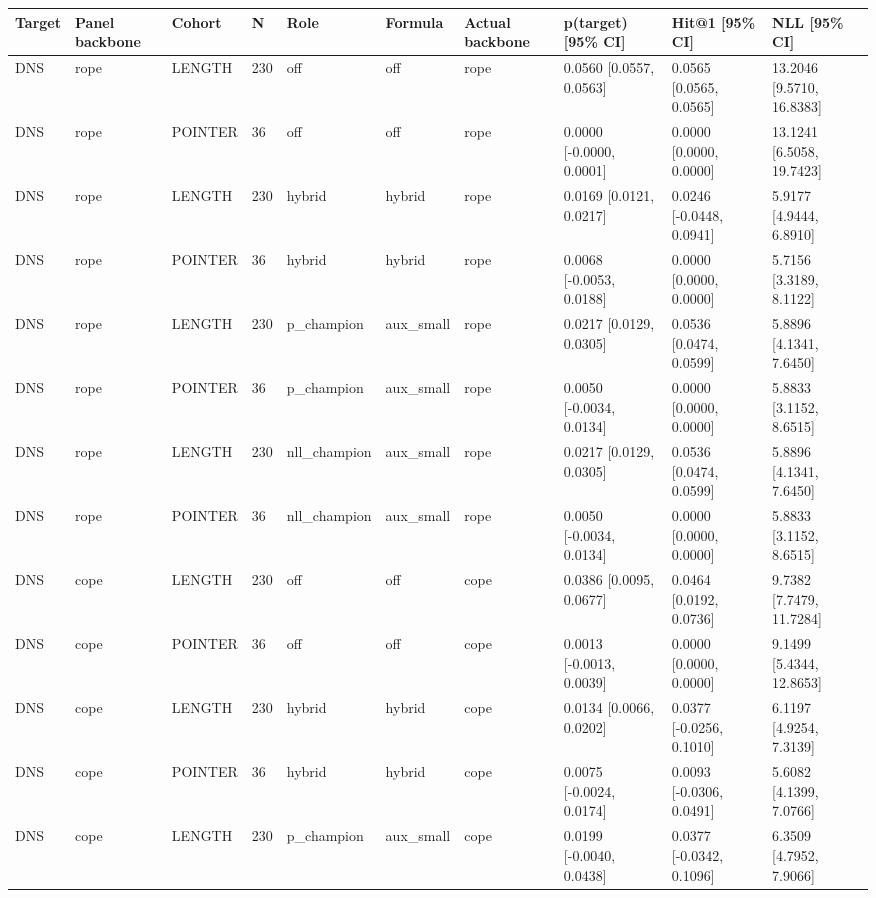 \begin{tabular}{llllllllll}
\hline
Target & Panel backbone & Cohort & N & Role & Formula & Actual backbone & p(target) [95\% CI] & Hit@1 [95\% CI] & NLL [95\% CI] \\
\hline
DNS & rope & LENGTH & 230 & off & off & rope & 0.0560 [0.0557, 0.0563] & 0.0565 [0.0565, 0.0565] & 13.2046 [9.5710, 16.8383] \\
DNS & rope & POINTER & 36 & off & off & rope & 0.0000 [-0.0000, 0.0001] & 0.0000 [0.0000, 0.0000] & 13.1241 [6.5058, 19.7423] \\
DNS & rope & LENGTH & 230 & hybrid & hybrid & rope & 0.0169 [0.0121, 0.0217] & 0.0246 [-0.0448, 0.0941] & 5.9177 [4.9444, 6.8910] \\
DNS & rope & POINTER & 36 & hybrid & hybrid & rope & 0.0068 [-0.0053, 0.0188] & 0.0000 [0.0000, 0.0000] & 5.7156 [3.3189, 8.1122] \\
DNS & rope & LENGTH & 230 & p\_champion & aux\_small & rope & 0.0217 [0.0129, 0.0305] & 0.0536 [0.0474, 0.0599] & 5.8896 [4.1341, 7.6450] \\
DNS & rope & POINTER & 36 & p\_champion & aux\_small & rope & 0.0050 [-0.0034, 0.0134] & 0.0000 [0.0000, 0.0000] & 5.8833 [3.1152, 8.6515] \\
DNS & rope & LENGTH & 230 & nll\_champion & aux\_small & rope & 0.0217 [0.0129, 0.0305] & 0.0536 [0.0474, 0.0599] & 5.8896 [4.1341, 7.6450] \\
DNS & rope & POINTER & 36 & nll\_champion & aux\_small & rope & 0.0050 [-0.0034, 0.0134] & 0.0000 [0.0000, 0.0000] & 5.8833 [3.1152, 8.6515] \\
DNS & cope & LENGTH & 230 & off & off & cope & 0.0386 [0.0095, 0.0677] & 0.0464 [0.0192, 0.0736] & 9.7382 [7.7479, 11.7284] \\
DNS & cope & POINTER & 36 & off & off & cope & 0.0013 [-0.0013, 0.0039] & 0.0000 [0.0000, 0.0000] & 9.1499 [5.4344, 12.8653] \\
DNS & cope & LENGTH & 230 & hybrid & hybrid & cope & 0.0134 [0.0066, 0.0202] & 0.0377 [-0.0256, 0.1010] & 6.1197 [4.9254, 7.3139] \\
DNS & cope & POINTER & 36 & hybrid & hybrid & cope & 0.0075 [-0.0024, 0.0174] & 0.0093 [-0.0306, 0.0491] & 5.6082 [4.1399, 7.0766] \\
DNS & cope & LENGTH & 230 & p\_champion & aux\_small & cope & 0.0199 [-0.0040, 0.0438] & 0.0377 [-0.0342, 0.1096] & 6.3509 [4.7952, 7.9066] \\

\end{tabular}
